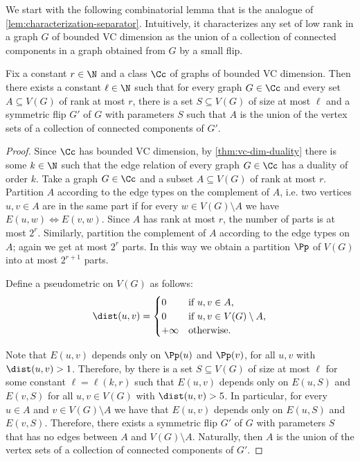 We start with the following combinatorial lemma that is the analogue of \cref{lem:characterization-separator}. Intuitively, it characterizes any set of low rank in a graph $G$ of bounded VC dimension as the union of a collection of connected components in a graph obtained from $G$ by a small flip.
\begin{lemma}
    \label{lem:low-rank-sets-in-flipconn}
    Fix a constant $r \in \N$ and a class  $\Cc$ of graphs of bounded VC dimension.
    Then there exists a constant $\ell \in \N$ such that for every graph $G \in \Cc$ and every set $A \subseteq V(G)$ of rank at most $r$, there is a set $S \subseteq V(G)$ of size at most $\ell$ and a symmetric flip $G'$ of $G$ with parameters $S$ such that $A$ is the union of the vertex sets of a collection of connected components of $G'$.
\end{lemma}

\begin{proof}
    Since $\Cc$ has bounded VC dimension, by \cref{thm:vc-dim-duality} there is some $k \in \N$ such that the edge relation of every graph $G \in \Cc$ has a duality of order $k$.
    Take a graph $G \in \Cc$ and a subset $A \subseteq V(G)$ of rank at most $r$.
    Partition $A$ according to the edge types on the complement of $A$, i.e. two vertices $u, v \in A$ are in the same part if for every $w \in V(G) \setminus A$ we have $E(u, w) \iff E(v, w)$.
    Since $A$ has rank at most $r$, the number of parts is at most $2^r$.
    Similarly, partition the complement of $A$ according to the edge types on $A$; again we get at most $2^r$ parts.
    In this way we obtain a partition $\Pp$ of $V(G)$ into at most $2^{r + 1}$ parts.

    Define a pseudometric on $V(G)$ as follows:
    \[
        \dist(u, v) =
        \begin{cases}
            0 & \text{if $u, v \in A$,} \\
            0 & \text{if $u, v \in V(G) \setminus A$,} \\
            +\infty & \text{otherwise.}
        \end{cases}
    \]

    Note that $E(u, v)$ depends only on $\Pp(u)$ and $\Pp(v)$, for all $u, v$ with $\dist(u, v) > 1$.
    Therefore, by  there is a set $S \subseteq V(G)$ of size at most $\ell$ for some constant $\ell = \ell(k, r)$ such that $E(u, v)$ depends only on $E(u, S)$ and $E(v, S)$ for all $u, v \in V(G)$ with $\dist(u, v) > 5$.
    In particular, for every $u \in A$ and $v \in V(G) \setminus A$ we have that $E(u, v)$ depends only on $E(u, S)$ and $E(v, S)$.
    Therefore, there exists a symmetric flip $G'$ of $G$ with parameters $S$ that has no edges between $A$ and $V(G) \setminus A$.
    Naturally, then $A$ is the union of the vertex sets of a collection of connected components of $G'$.
\end{proof}

